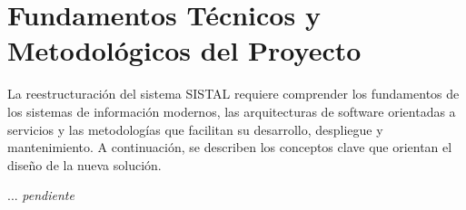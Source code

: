 \section{Fundamentos Técnicos y Metodológicos del Proyecto}

La reestructuración del sistema SISTAL requiere comprender los fundamentos de los sistemas de información modernos, las arquitecturas de software orientadas a servicios y las metodologías que facilitan su desarrollo, despliegue y mantenimiento. A continuación, se describen los conceptos clave que orientan el diseño de la nueva solución.

... \textit{pendiente}

\begin{comment}
    \subsection{Sistemas de Información y su Rol en la Gestión Organizacional}

    Un \textit{sistema de información} es un conjunto integrado de componentes que permite capturar, procesar, almacenar y distribuir información para apoyar la toma de decisiones y el control dentro de una organización. Estos sistemas combinan personas, procesos, datos y tecnología, buscando mejorar la eficiencia operativa y la calidad del servicio.

    En el caso de la gestión de uniformes, un sistema de información como SISTAL facilita la trazabilidad de pedidos, la personalización de tallas y la coordinación entre los distintos actores involucrados (funcionarios, administradores y proveedores). Su adecuada arquitectura es esencial para garantizar la continuidad y confiabilidad de los procesos institucionales.

    \subsection{Arquitectura de Software}

    La \textit{arquitectura de software} define la estructura organizativa de un sistema y las relaciones entre sus componentes. Un diseño arquitectónico adecuado permite alcanzar cualidades como mantenibilidad, escalabilidad y flexibilidad ante cambios futuros.

    Tradicionalmente, muchos sistemas como SISTAL se desarrollaron bajo un \textit{modelo monolítico}, en el cual todas las funcionalidades están estrechamente integradas en una única aplicación. Si bien este enfoque simplifica el despliegue inicial, con el tiempo dificulta la incorporación de nuevas características, la escalabilidad independiente de módulos y la adopción de tecnologías modernas.


\end{comment}
